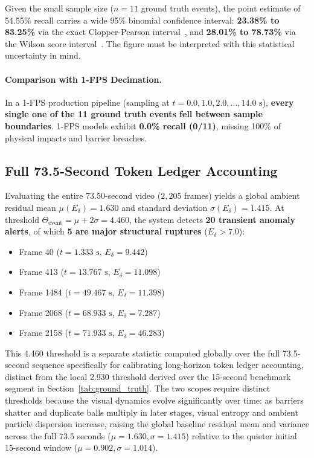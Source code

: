 \documentclass[11pt]{article}
\begin{document}
Given the small sample size ($n = 11$ ground truth events), the point estimate of 54.55\% recall carries a wide 95\% binomial confidence interval: \textbf{23.38\% to 83.25\%} via the exact Clopper-Pearson interval~\citep{clopper1934use}, and \textbf{28.01\% to 78.73\%} via the Wilson score interval~\citep{wilson1927probable}. The figure must be interpreted with this statistical uncertainty in mind.

\paragraph{Comparison with 1-FPS Decimation.} In a 1-FPS production pipeline (sampling at $t = 0.0, 1.0, 2.0, \dots, 14.0\text{ s}$), \textbf{every single one of the 11 ground truth events fell between sample boundaries}. 1-FPS models exhibit \textbf{0.0\% recall (0/11)}, missing 100\% of physical impacts and barrier breaches.

\subsection{Full 73.5-Second Token Ledger Accounting}

Evaluating the entire 73.50-second video ($2,205$ frames) yields a global ambient residual mean $\mu(E_\delta) = 1.630$ and standard deviation $\sigma(E_\delta) = 1.415$. At threshold $\Theta_{\text{event}} = \mu + 2\sigma = 4.460$, the system detects \textbf{20 transient anomaly alerts}, of which \textbf{5 are major structural ruptures} ($E_\delta > 7.0$):
\begin{itemize}
    \item Frame 40 ($t=1.333\text{ s}$, $E_\delta = 9.442$)
    \item Frame 413 ($t=13.767\text{ s}$, $E_\delta = 11.098$)
    \item Frame 1484 ($t=49.467\text{ s}$, $E_\delta = 11.398$)
    \item Frame 2068 ($t=68.933\text{ s}$, $E_\delta = 7.287$)
    \item Frame 2158 ($t=71.933\text{ s}$, $E_\delta = 46.283$)
\end{itemize}

This 4.460 threshold is a separate statistic computed globally over the full 73.5-second sequence specifically for calibrating long-horizon token ledger accounting, distinct from the local 2.930 threshold derived over the 15-second benchmark segment in Section~\ref{tab:ground_truth}. The two scopes require distinct thresholds because the visual dynamics evolve significantly over time: as barriers shatter and duplicate balls multiply in later stages, visual entropy and ambient particle dispersion increase, raising the global baseline residual mean and variance across the full 73.5 seconds ($\mu=1.630, \sigma=1.415$) relative to the quieter initial 15-second window ($\mu=0.902, \sigma=1.014$).
\end{document}
